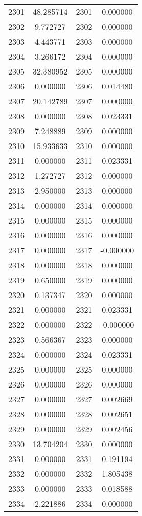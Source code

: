 \documentclass[12pt]{article}
\begin{document}
\begin{longtable}{@{}cccc@{}}
2301 & 48.285714 & 2301 & 0.000000 \\
2302 & 9.772727 & 2302 & 0.000000 \\
2303 & 4.443771 & 2303 & 0.000000 \\
2304 & 3.266172 & 2304 & 0.000000 \\
2305 & 32.380952 & 2305 & 0.000000 \\
2306 & 0.000000 & 2306 & 0.014480 \\
2307 & 20.142789 & 2307 & 0.000000 \\
2308 & 0.000000 & 2308 & 0.023331 \\
2309 & 7.248889 & 2309 & 0.000000 \\
2310 & 15.933633 & 2310 & 0.000000 \\
2311 & 0.000000 & 2311 & 0.023331 \\
2312 & 1.272727 & 2312 & 0.000000 \\
2313 & 2.950000 & 2313 & 0.000000 \\
2314 & 0.000000 & 2314 & 0.000000 \\
2315 & 0.000000 & 2315 & 0.000000 \\
2316 & 0.000000 & 2316 & 0.000000 \\
2317 & 0.000000 & 2317 & -0.000000 \\
2318 & 0.000000 & 2318 & 0.000000 \\
2319 & 0.650000 & 2319 & 0.000000 \\
2320 & 0.137347 & 2320 & 0.000000 \\
2321 & 0.000000 & 2321 & 0.023331 \\
2322 & 0.000000 & 2322 & -0.000000 \\
2323 & 0.566367 & 2323 & 0.000000 \\
2324 & 0.000000 & 2324 & 0.023331 \\
2325 & 0.000000 & 2325 & 0.000000 \\
2326 & 0.000000 & 2326 & 0.000000 \\
2327 & 0.000000 & 2327 & 0.002669 \\
2328 & 0.000000 & 2328 & 0.002651 \\
2329 & 0.000000 & 2329 & 0.002456 \\
2330 & 13.704204 & 2330 & 0.000000 \\
2331 & 0.000000 & 2331 & 0.191194 \\
2332 & 0.000000 & 2332 & 1.805438 \\
2333 & 0.000000 & 2333 & 0.018588 \\
2334 & 2.221886 & 2334 & 0.000000 \\

\end{longtable}
\end{document}
